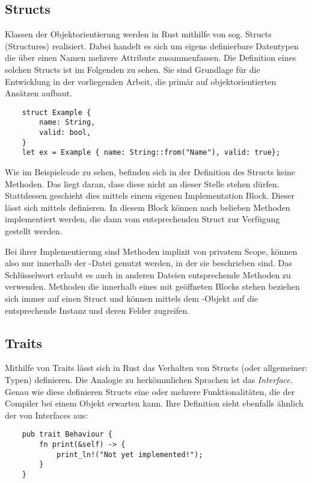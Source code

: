 \subsection{Structs}

Klassen der Objektorientierung werden in Rust mithilfe von sog. \glqq Structs\grqq{} (Structures) realisiert. Dabei handelt es sich um eigens definierbare Datentypen die über einen Namen mehrere Attribute zusammenfassen. Die Definition eines solchen Structs ist im Folgenden zu sehen. Sie sind Grundlage für die Entwicklung in der vorliegenden Arbeit, die primär auf objektorientierten Ansätzen aufbaut.

\begin{verbatim}
    struct Example {
        name: String,
	    valid: bool,
    }
    let ex = Example { name: String::from("Name"), valid: true};
\end{verbatim}


Wie im Beispielcode zu sehen, befinden sich in der Definition des Structs  keine Methoden. Das liegt daran, dass diese nicht an dieser Stelle stehen dürfen. Stattdessen geschieht dies mittels einem eigenen \glqq Implementation Block\grqq. Dieser lässt sich mittels  definieren. In diesem Block können nach belieben Methoden implementiert werden, die dann vom entsprechenden Struct zur Verfügung gestellt werden. 

Bei ihrer Implementierung sind Methoden implizit von privatem Scope, können also nur innerhalb der -Datei genutzt werden, in der sie beschrieben sind. Das Schlüsselwort  erlaubt es auch in anderen Dateien entsprechende Methoden zu verwenden. Methoden die innerhalb eines mit  geöffneten Blocks stehen beziehen sich immer auf einen Struct und können mittels dem -Objekt auf die entsprechende Instanz und deren Felder zugreifen.

\subsection{Traits}

Mithilfe von Traits lässt sich in Rust das Verhalten von Structs (oder allgemeiner: Typen) definieren. Die Analogie zu herkömmlichen Sprachen ist das \textit{Interface}. Genau wie diese definieren Structs eine oder mehrere Funktionalitäten, die der Compiler bei einem Objekt erwarten kann. Ihre Definition sieht ebenfalls ähnlich der von Interfaces aus:

\begin{verbatim}
    pub trait Behaviour {
        fn print(&self) -> {
            print_ln!("Not yet implemented!");
        }
    }
\end{verbatim}



